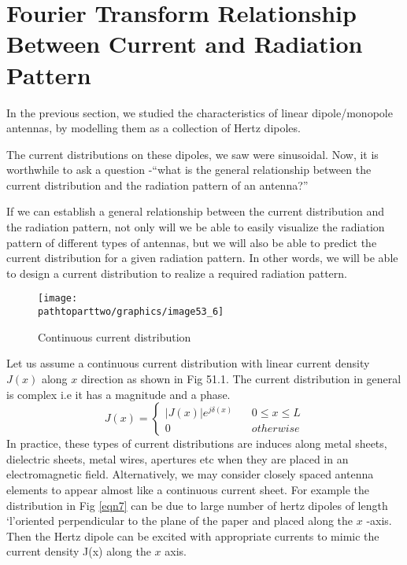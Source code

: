 \chapter{Fourier Transform Relationship Between Current and Radiation Pattern}
In the previous section, we studied the characteristics of linear dipole/monopole antennas, by modelling them as a collection of Hertz dipoles. 

The current distributions on these dipoles, we saw were sinusoidal. Now, it is worthwhile to ask a question -\textquotedblleft what is the general relationship between the current distribution and the radiation pattern of an antenna?\textquotedblright

If we can establish a general relationship between the current distribution and the radiation pattern, not only will we be able to easily visualize the radiation pattern of different types of antennas, but we will also be able to predict the current distribution for a given radiation pattern. In other words, we will be able to design a current distribution to realize a required radiation pattern.
\begin{figure}[h]
\centering
\texttt{[image: \\pathtoparttwo/graphics/image53\_6]}
\caption{Continuous current distribution}
\label{fig:fig6}
\end{figure}

Let us assume a continuous current distribution with linear current density $J(x)$ along $x$ direction as shown in Fig 51.1. The current distribution in general is complex i.e it has a magnitude and a phase.
\begin{equation}
J(x) =
\begin{cases}
|J(x)| e^{j\delta (x)} \ \ \ \ & 0\le x \le L \\
0  & otherwise
\end{cases}
\end{equation}
In practice, these types of current distributions are induces along metal sheets, dielectric sheets, metal wires, apertures etc when they are placed  in an electromagnetic field. Alternatively, we may consider closely spaced antenna elements to appear almost like a continuous current sheet. For example the distribution in Fig \ref{eqn7} can be due to large number of hertz dipoles of length \textquoteleft l\textquoteright oriented perpendicular to the plane of the paper and placed along the $x$ -axis. Then the Hertz dipole can be excited with appropriate currents to mimic the current density J(x) along the $x$ axis.

